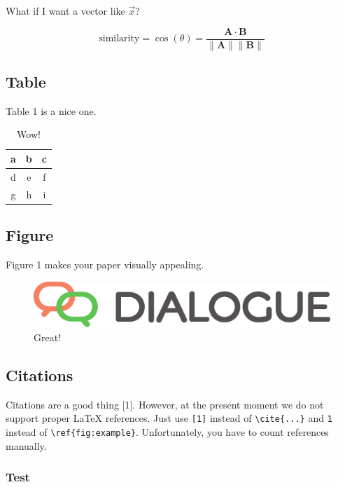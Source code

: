\documentclass{dialogue}
\begin{document}
What if I want a vector like $\vec{x}$?

\begin{equation}
  \text{similarity} = \cos(\theta) = \frac{\mathbf{A} \cdot \mathbf{B}}{\|\mathbf{A}\| \|\mathbf{B}\|}
\end{equation}

\subsection{Table}

Table 1 is a nice one.

\begin{table}[htbp]
\centering
\caption{Wow!}
\begin{tabular}{|c|c|c|}\hline
a & b & c \\\hline
d & e & f \\\hline
g & h & i \\\hline
\end{tabular}
\end{table}

\subsection{Figure}

Figure 1 makes your paper visually appealing.

\begin{figure}[htbp]
\centering
\includegraphics[scale=.4]{dialogue.eps}
\caption{Great!}
\end{figure}

\subsection{Citations}

Citations are a good thing [1]. However, at the present moment we do not support proper {\LaTeX} references. Just use \verb|[1]| instead of \verb|\cite{...}| and \verb|1| instead of \verb|\ref{fig:example}|. Unfortunately, you have to count references manually.

\subsubsection{Test}
\end{document}
